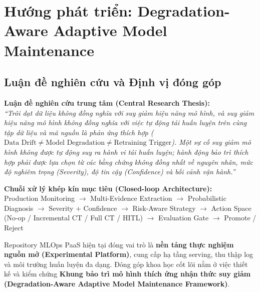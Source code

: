 \section{Hướng phát triển: Degradation-Aware Adaptive Model Maintenance}

\subsection{Luận đề nghiên cứu và Định vị đóng góp}

\begin{tcolorbox}[colback=blue!3!white,colframe=blue!45!black,arc=2pt,boxrule=0.6pt,top=4pt,bottom=4pt,left=6pt,right=6pt]
\textbf{Luận đề nghiên cứu trung tâm (Central Research Thesis):}\\[0.2em]
\emph{``Trôi dạt dữ liệu không đồng nghĩa với suy giảm hiệu năng mô hình, và suy giảm hiệu năng mô hình không đồng nghĩa với việc tự động tái huấn luyện trên cùng tập dữ liệu và mã nguồn là phản ứng thích hợp ($\text{Data Drift} \neq \text{Model Degradation} \neq \text{Retraining Trigger}$). Một sự cố suy giảm mô hình không được tự động suy ra hành vi tái huấn luyện; hành động bảo trì thích hợp phải được lựa chọn từ các bằng chứng không đồng nhất về nguyên nhân, mức độ nghiêm trọng (Severity), độ tin cậy (Confidence) và bối cảnh vận hành.''}
\end{tcolorbox}

\begin{tcolorbox}[colback=orange!4!white,colframe=orange!55!black,arc=2pt,boxrule=0.6pt,top=3pt,bottom=3pt,left=4pt,right=4pt,halign=center]
\small\textbf{Chuỗi xử lý khép kín mục tiêu (Closed-loop Architecture):}\\[0.1em]
Production Monitoring $\rightarrow$ Multi-Evidence Extraction $\rightarrow$ Probabilistic Diagnosis $\rightarrow$ Severity + Confidence $\rightarrow$ Risk-Aware Strategy $\rightarrow$ Action Space (No-op / Incremental CT / Full CT / HITL) $\rightarrow$ Evaluation Gate $\rightarrow$ Promote / Reject
\end{tcolorbox}

Repository MLOps PaaS hiện tại đóng vai trò là \textbf{nền tảng thực nghiệm nguồn mở (Experimental Platform)}, cung cấp hạ tầng serving, thu thập log và môi trường huấn luyện đa dạng. Đóng góp khoa học cốt lõi nằm ở việc thiết kế và kiểm chứng \textbf{Khung bảo trì mô hình thích ứng nhận thức suy giảm (Degradation-Aware Adaptive Model Maintenance Framework)}.

